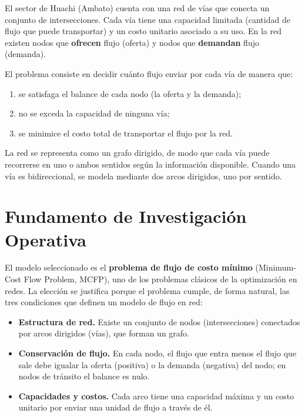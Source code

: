 \documentclass{article}
\begin{document}
El sector de Huachi (Ambato) cuenta con una red de vías que conecta un conjunto
de intersecciones. Cada vía tiene una capacidad limitada (cantidad de flujo que
puede transportar) y un costo unitario asociado a su uso. En la red existen
nodos que \textbf{ofrecen} flujo (oferta) y nodos que \textbf{demandan} flujo
(demanda).

El problema consiste en decidir cuánto flujo enviar por cada vía de manera que:
\begin{enumerate}
    \item se satisfaga el balance de cada nodo (la oferta y la demanda);
    \item no se exceda la capacidad de ninguna vía;
    \item se minimice el costo total de transportar el flujo por la red.
\end{enumerate}

La red se representa como un grafo dirigido, de modo que cada vía puede
recorrerse en uno o ambos sentidos según la información disponible. Cuando una
vía es bidireccional, se modela mediante dos arcos dirigidos, uno por sentido.

\section{Fundamento de Investigación Operativa}

El modelo seleccionado es el \textbf{problema de flujo de costo mínimo}
(Minimum-Cost Flow Problem, MCFP), uno de los problemas clásicos de la
optimización en redes. La elección se justifica porque el problema cumple,
de forma natural, las tres condiciones que definen un modelo de flujo en red:

\begin{itemize}
    \item \textbf{Estructura de red.} Existe un conjunto de nodos (intersecciones)
          conectados por arcos dirigidos (vías), que forman un grafo.
    \item \textbf{Conservación de flujo.} En cada nodo, el flujo que entra menos
          el flujo que sale debe igualar la oferta (positiva) o la demanda
          (negativa) del nodo; en nodos de tránsito el balance es nulo.
    \item \textbf{Capacidades y costos.} Cada arco tiene una capacidad máxima y
          un costo unitario por enviar una unidad de flujo a través de él.
\end{itemize}
\end{document}
